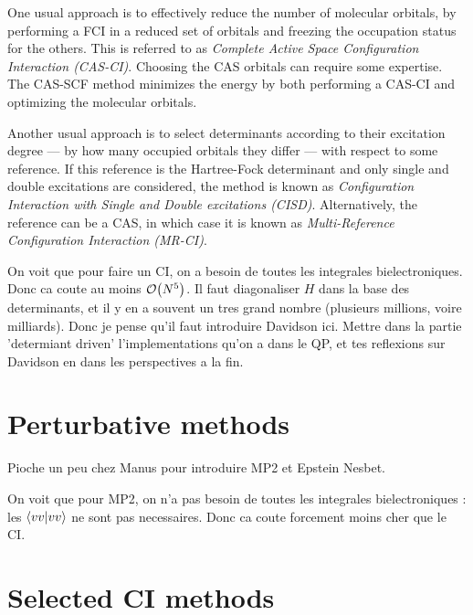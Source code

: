 \documentclass[./thesis.tex]{subfiles}
\begin{document}
One usual approach is to effectively reduce the number of molecular orbitals, by performing a FCI in a reduced set of orbitals and freezing the occupation status for the others. This is referred to as \emph{Complete Active Space Configuration Interaction (CAS-CI)}. Choosing the CAS orbitals can require some expertise. The CAS-SCF method minimizes the energy by both performing a CAS-CI and optimizing the molecular orbitals.

Another usual approach is to select determinants according to their excitation degree --- by how many occupied orbitals they differ --- with respect to some reference. If this reference is the Hartree-Fock determinant and only single and double excitations are considered, the method is known as \emph{Configuration Interaction with Single and Double excitations (CISD)}. Alternatively, the reference can be a CAS, in which case it is known as \emph{Multi-Reference Configuration Interaction (MR-CI)}.


\alert{On voit que pour faire un CI, on a besoin de toutes les integrales
bielectroniques. Donc ca coute au moins $\order{N^5}$.  Il faut diagonaliser
$H$ dans la base des determinants, et il y en a souvent un tres grand nombre
(plusieurs millions, voire milliards). Donc je pense qu'il faut introduire
Davidson ici. Mettre dans la partie 'determiant driven' l'implementations qu'on
a dans le QP, et tes reflexions sur Davidson en dans les perspectives a la fin.
}

\section{Perturbative methods}

\alert{Pioche un peu chez Manus pour introduire MP2 et Epstein Nesbet.}

\alert{On voit que pour MP2, on n'a pas besoin de toutes les integrales
bielectroniques : les $\braket{vv}{vv}$ ne sont pas necessaires. Donc ca coute
forcement moins cher que le CI.}

\section{Selected CI methods}
\end{document}
